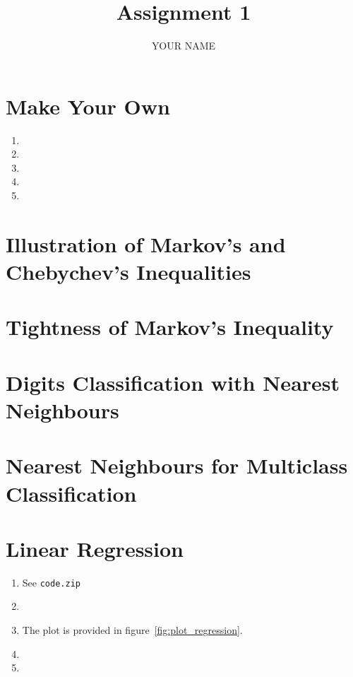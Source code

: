 \documentclass[a4paper]{article}
\title{\vspace{-5cm} Assignment 1}
\author{YOUR NAME}
\begin{document}
\maketitle

\tableofcontents

\section{Make Your Own}

\begin{enumerate}
  \item 
  \item 
  \item 
  \item 
  \item 
\end{enumerate}

\section{Illustration of Markov's and Chebychev's Inequalities}

\section{Tightness of Markov's Inequality}

\section{Digits Classification with Nearest Neighbours}

\section{Nearest Neighbours for Multiclass Classification}

\section{Linear Regression}

\begin{enumerate}
  \item See \texttt{code.zip}
  \item 
  \item The plot is provided in figure~\ref{fig:plot_regression}.
  \item 
  \item 
\end{enumerate}
\end{document}
